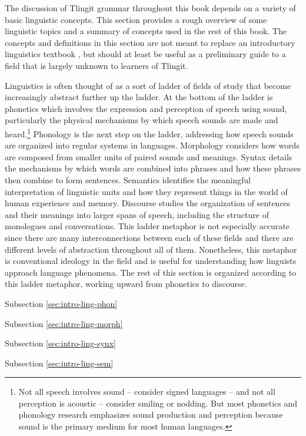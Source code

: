 The discussion of Tlingit grammar throughout this book depends on a variety of basic linguistic concepts. This section provides a rough overview of some linguistic topics and a summary of concepts used in the rest of this book. The concepts and definitions in this section are not meant to replace an introductory linguistics textbook \parencites[e.g.][]{radford-atkinson-britain-etc:2009}{yule:2010}{anderson:2018}, but should at least be useful as a preliminary guide to a field that is largely unknown to learners of Tlingit.

Linguistics is often thought of as a sort of ladder of fields of study that become increasingly abstract further up the ladder.  At the bottom of the ladder is phonetics which involves the expression and perception of speech using sound, particularly the physical mechanisms by which speech sounds are made and heard.\footnote{Not all speech involves sound – consider signed languages – and not all perception is acoustic – consider smiling or nodding. But most phonetics and phonology research emphasizes sound production and perception because sound is the primary medium for most human languages.} Phonology is the next step on the ladder, addressing how speech sounds are organized into regular systems in languages. Morphology considers how words are composed from smaller units of paired sounds and meanings. Syntax details the mechanisms by which words are combined into phrases and how these phrases then combine to form sentences. Semantics identifies the meaningful interpretation of linguistic units and how they represent things in the world of human experience and memory. Discourse studies the organization of sentences and their meanings into larger spans of speech, including the structure of monologues and conversations. This ladder metaphor is not especially accurate since there are many interconnections between each of these fields and there are different levels of abstraction throughout all of them. Nonetheless, this metaphor is conventional ideology in the field and is useful for understanding how linguists approach language phenomena. The rest of this section is organized according to this ladder metaphor, working upward from phonetics to discourse.

Subsection \ref{sec:intro-ling-phon} 

Subsection \ref{sec:intro-ling-morph}

Subsection \ref{sec:intro-ling-synx}

Subsection \ref{sec:intro-ling-sem}

